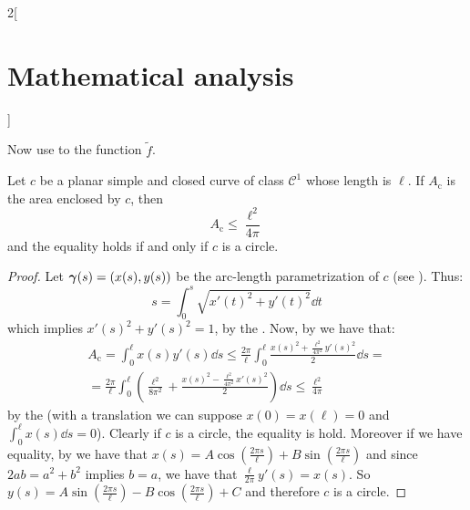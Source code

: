 \documentclass[../../../main_math.tex]{subfiles}
\begin{document}
\begin{multicols}{2}[\section{Mathematical analysis}]
\begin{sproof}
    Now use  to the function $\tilde{f}$.
  \end{sproof}
  \begin{theorem}
    Let $c$ be a planar simple and closed curve of class $\mathcal{C}^1$ whose length is $\ell$. If $A_\mathrm{c}$ is the area enclosed by $c$, then $$A_\mathrm{c}\leq\frac{\ell^2}{4\pi}$$ and the equality holds if and only if $c$ is a circle.
  \end{theorem}
  \begin{proof}
    Let $\boldsymbol{\mathrm{\gamma}}(s)=(x(s),y(s))$ be the arc-length parametrization of $c$ (see ). Thus:
    $$s=\int_0^s\sqrt{{x'(t)}^2+{y'(t)}^2}\dd{t}$$
    which implies ${x'(s)}^2+{y'(s)}^2=1$, by the . Now, by  we have that:
    \begin{multline*}
      A_\mathrm{c}=\int_{0}^{\ell}x(s)y'(s)\dd{s}\leq\frac{2\pi}{\ell}\int_{0}^{\ell}\frac{{x(s)}^2+\frac{\ell^2}{4\pi^2}{y'(s)}^2}{2}\dd{s}=\\
      =\frac{2\pi}{\ell}\int_{0}^{\ell}\left(\frac{\ell^2}{8\pi^2}+\frac{{x(s)}^2-\frac{\ell^2}{4\pi^2}{x'(s)}^2}{2}\right)\dd{s}\leq \frac{\ell^2}{4\pi}
    \end{multline*}
    by the  (with a translation we can suppose $x(0)=x(\ell)=0$ and $\int_0^\ell x(s)\dd{s}=0$). Clearly if $c$ is a circle, the equality is hold. Moreover if we have equality, by  we have that $x(s)=A\cos\left(\frac{2\pi s}{\ell}\right)+B\sin\left(\frac{2\pi s}{\ell}\right)$ and since $2ab=a^2+b^2$ implies $b=a$, we have that $\frac{\ell}{2\pi}y'(s)=x(s)$. So $y(s)=A\sin\left(\frac{2\pi s}{\ell}\right)-B\cos\left(\frac{2\pi s}{\ell}\right)+C$ and therefore $c$ is a circle.
  \end{proof}
\end{multicols}
\end{document}
